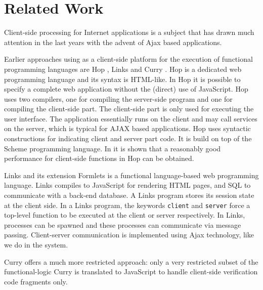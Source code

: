 \section{Related Work}\label{sapljs:sec:related}
Client-side processing for Internet applications is a subject that has drawn much attention in the last years with the advent of \textsf{Ajax} based
applications.%

Earlier approaches using \JS as a client-side platform for the execution of functional programming languages are \textsf{Hop} \cite{HOP1,HOP2},
Links \cite{LINKS1}and \textsf{Curry}  \cite{CURRY}. 
\textsf{Hop} is a dedicated web programming language and its syntax is \textsf{HTML}-like. 
In \textsf{Hop} it is  possible to specify a complete web application without the (direct) use of \textsf{JavaScript}. 
\textsf{Hop} uses two compilers, one for compiling the server-side program and one for compiling the client-side part. 
The client-side part is only used for executing the user interface. 
The application essentially runs on the client and may call services on the server, which is typical for \textsf{AJAX} based applications. 
\textsf{Hop} uses syntactic constructions for indicating client and server part code. It is build on top of the Scheme programming language. 
In \cite{HOP2} it is shown that a reasonably good performance for client-side functions in \textsf{Hop} can be obtained. 

\textsf{Links} \cite{LINKS1} and its extension \textsf{Formlets}  is a functional language-based web programming language. \textsf{Links} compiles to \textsf{JavaScript} for rendering \textsf{HTML} pages, and SQL to communicate with a back-end database. A \textsf{Links} program stores its session state at the client side. In a \textsf{Links} program, the keywords \texttt{client} and \texttt{server} force a top-level function to be executed at the client or server respectively. In \textsf{Links}, processes can be spawned and these processes can communicate via message passing. Client-server communication is implemented using \textsf{Ajax} technology, like we do in the \iTask system. 

 \textsf{Curry} offers a much more restricted approach:
 only a very restricted subset of the functional-logic \textsf{Curry} is translated to \textsf{JavaScript} to handle client-side verification code fragments only.

